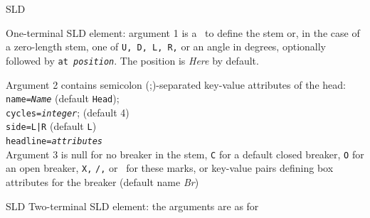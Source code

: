 %
  {SLD}%
  {One-terminal SLD element: argument 1 is a \linespec\ to define the stem
   or, in the case of a zero-length stem, one of {\tt U, D, L, R,} or an
   angle in degrees, optionally followed by {\tt at {\sl position}}.
   The position is {\sl Here} by default.

   Argument 2 contains semicolon (;)-separated key-value attributes
   of the head:\\
   {\tt name={\sl{}Name}} (default {\tt Head});\\
   {\tt cycles={\sl{}integer}}; (default 4)\\
   {\tt side={\tt L|R}} (default {\tt L})\\
   {\tt headline={\sl attributes}}\\

   Argument 3 is null for no breaker in the stem, {\tt C} for a default
   closed breaker, {\tt O} for an open breaker, {\tt X,} {\tt /,} or \bsl\ for
   these marks, or
   key-value pairs defining box attributes for the breaker
   (default name {\sl Br})
   \label{sl_inductor}
   }%
%
  {SLD}%
  {Two-terminal SLD element: the arguments are as for 
   }%

